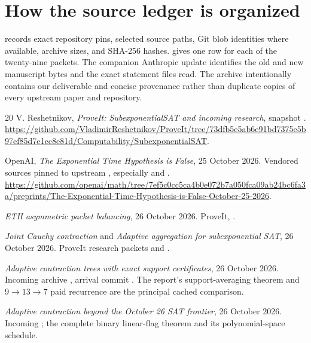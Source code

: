 \documentclass[11pt]{article}
\theoremstyle{definition}\newtheorem{definition}[theorem]{Definition}
\theoremstyle{remark}\newtheorem{remark}[theorem]{Remark}
\begin{document}
\section{How the source ledger is organized}
 records exact repository pins,
selected source paths, Git blob identities where available, archive sizes,
and SHA-256 hashes.  gives one row for
each of the twenty-nine packets. The companion Anthropic update identifies
the old and new manuscript bytes and the exact statement files read.
The archive intentionally contains our deliverable and concise provenance
rather than duplicate copies of every upstream paper and repository.

\begin{thebibliography}{20}
 V. Reshetnikov, \emph{ProveIt: SubexponentialSAT and incoming
research}, snapshot .
\url{https://github.com/VladimirReshetnikov/ProveIt/tree/73dfb5e5ab6e91bd7375e5b97ef85d7e1cc8e81d/Computability/SubexponentialSAT}.

 OpenAI, \emph{The Exponential Time Hypothesis is False},
25 October 2026. Vendored sources pinned to upstream
, especially
 and
.
\url{https://github.com/openai/math/tree/7ef5c0cc5ca4b0e072b7a050fca09ab24bc6fa3a/preprints/The-Exponential-Time-Hypothesis-is-False-October-25-2026}.

 \emph{ETH asymmetric packet balancing}, 26 October 2026.
ProveIt, .

 \emph{Joint Cauchy contraction} and \emph{Adaptive aggregation
for subexponential SAT}, 26 October 2026. ProveIt research packets
 and .

 \emph{Adaptive contraction trees with exact support
certificates}, 26 October 2026. Incoming archive
, arrival commit
. The report's
support-averaging theorem and $9\to13\to7$ paid recurrence are the
principal cached comparison.

 \emph{Adaptive contraction beyond the October 26 SAT
frontier}, 26 October 2026. Incoming
; the complete binary linear-flag
theorem and its polynomial-space schedule.


\end{thebibliography}
\end{document}
